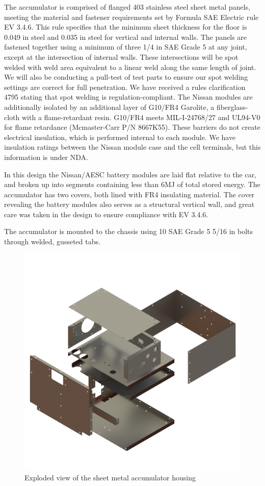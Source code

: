 \documentclass{article}
\begin{document}

            The accumulator is comprised of flanged 403 stainless steel sheet metal panels, meeting the material and fastener requirements set by Formula SAE Electric rule EV 3.4.6. This rule specifies that the minimum sheet thickness for the floor is 0.049 in steel and 0.035 in steel for vertical and internal walls. The panels are fastened together using a minimum of three 1/4 in SAE Grade 5 at any joint, except at the intersection of internal walls. These intersections will be spot welded with weld area equivalent to a linear weld along the same length of joint. We will also be conducting a pull-test of test parts to ensure our spot welding settings are correct for full penetration. We have received a rules clarification 4795 stating that spot welding is regulation-compliant. The Nissan modules are additionally isolated by an additional layer of G10/FR4 Garolite, a fiberglass-cloth with a flame-retardant resin. G10/FR4 meets MIL-I-24768/27 and UL94-V0 for flame retardance (Mcmaster-Carr P/N 8667K55). These barriers do not create electrical insulation, which is performed internal to each module. We have insulation ratings between the Nissan module case and the cell terminals, but this information is under NDA.

            In this design the Nissan/AESC battery modules are laid flat relative to the car, and broken up into segments containing less than 6MJ of total stored energy. The accumulator has two covers, both lined with FR4 insulating material. The cover revealing the battery modules also serves as a structural vertical wall, and great care was taken in the design to ensure compliance with EV 3.4.6.

            The accumulator is mounted to the chassis using 10 SAE Grade 5 5/16 in bolts through welded, gusseted tabs.


            \begin{figure}[H]
                \centering
                \includegraphics[width = 0.5 \textwidth]{sheetmetal_isoview}
                \caption{Exploded view of the sheet metal accumulator housing}
                \label{cellcut}
            \end{figure}
\end{document}
